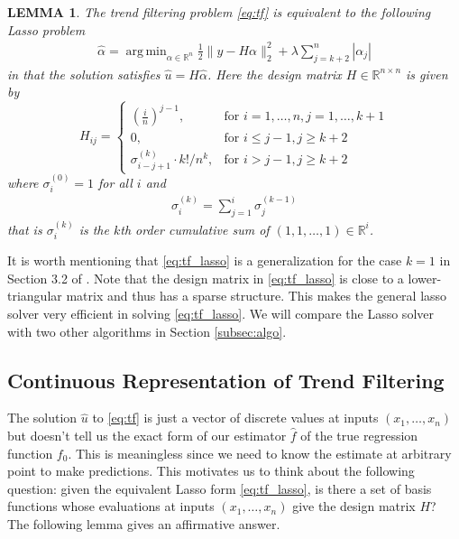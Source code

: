 \documentclass[a4paper]{article}
\DeclareMathOperator*{\argmin}{arg\,min}
\newtheorem{lemma}{LEMMA}
\newcommand{\RR}{\mathbb{R}}
\begin{document}
\begin{lemma}
The trend filtering problem \eqref{eq:tf} is equivalent to the following Lasso problem
\begin{align}
\hat{\alpha} = \argmin_{\alpha\in\RR^n}\frac{1}{2}\|y-H\alpha\|_2^2 + \lambda\sum_{j=k+2}^n |\alpha_j|
\label{eq:tf_lasso}
\end{align}
in that the solution satisfies $\hat{u} = H\hat{\alpha}$. Here the design matrix $H\in\RR^{n\times n}$ is given by
\begin{equation}
H_{ij} = 
\begin{cases}
(\frac{i}{n})^{j-1}, & \text{for } i = 1,\ldots, n, j=1,\ldots, k+1\\
0, & \text{for } i \leq j-1, j\geq k+2\\
\sigma_{i-j+1}^{(k)} \cdot k!/n^k, &\text{for } i > j-1, j\geq k+2
\end{cases}
\label{eq:H_cumsum}
\end{equation}
where $\sigma_i^{(0)} = 1$ for all $i$ and
\begin{align*}
\sigma^{(k)}_i = \sum_{j=1}^i \sigma_j^{(k-1)}
\end{align*}
that is $\sigma_i^{(k)}$ is the $k$th order cumulative sum of $(1,1,\ldots, 1)\in\RR^i$.
\label{lemma:tf_lasso}
\end{lemma}
It is worth mentioning that \eqref{eq:tf_lasso} is a generalization for the case $k =1$ in Section 3.2 of \cite{kim2009ell_1}. Note that the design matrix in \eqref{eq:tf_lasso} is close to a lower-triangular matrix and thus has a sparse structure. This makes the general lasso solver very efficient in solving \eqref{eq:tf_lasso}. We will compare the Lasso solver with two other algorithms in Section \ref{subsec:algo}. 

\subsection{Continuous Representation of Trend Filtering}
\label{subsec:ct_tf}
The solution $\hat{u}$ to \eqref{eq:tf} is just a vector of discrete values at inputs $(x_1,\ldots, x_n)$ but doesn't tell us the exact form of our estimator $\hat{f}$ of the true regression function $f_0$. This is meaningless since we need to know the estimate at arbitrary point to make predictions. This motivates us to think about the following question: given the equivalent Lasso form \eqref{eq:tf_lasso}, is there a set of basis functions whose evaluations at inputs $(x_1,\ldots, x_n)$ give the design matrix $H$? The following lemma gives an affirmative answer.
\end{document}

